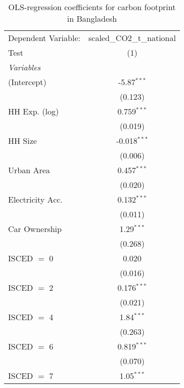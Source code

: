 
\begin{table}[htbp!]
   \centering
   \small
   \begin{adjustbox}{width = 1\textwidth, max height = 0.95\textheight, center}
      \begin{threeparttable}[b]
         \caption{\label{tab:OLS_2_BGD} OLS-regression coefficients for carbon footprint in Bangladesh}
         \begin{tabular}{lc}
            \tabularnewline \midrule \midrule
            Dependent Variable: & scaled\_CO2\_t\_national\\     
            Test                & (1)\\  
            \midrule
            \emph{Variables}\\
            (Intercept)         & -5.87$^{***}$\\   
                                & (0.123)\\   
            HH Exp. (log)       & 0.759$^{***}$\\   
                                & (0.019)\\   
            HH Size             & -0.018$^{***}$\\   
                                & (0.006)\\   
            Urban Area          & 0.457$^{***}$\\   
                                & (0.020)\\   
            Electricity Acc.    & 0.132$^{***}$\\   
                                & (0.011)\\   
            Car Ownership       & 1.29$^{***}$\\   
                                & (0.268)\\   
            ISCED $=$ 0         & 0.020\\   
                                & (0.016)\\   
            ISCED $=$ 2         & 0.176$^{***}$\\   
                                & (0.021)\\   
            ISCED $=$ 4         & 1.84$^{***}$\\   
                                & (0.263)\\   
            ISCED $=$ 6         & 0.819$^{***}$\\   
                                & (0.070)\\   
            ISCED $=$ 7         & 1.05$^{***}$\\   

\end{tabular}
\end{threeparttable}
\end{adjustbox}
\end{table}
